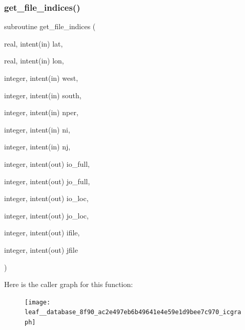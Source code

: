 \subsubsection{\texorpdfstring{get\+\_\+file\+\_\+indices()}{get\_file\_indices()}}
{\footnotesize\ttfamily subroutine get\+\_\+file\+\_\+indices (\begin{DoxyParamCaption}\item[{real, intent(in)}]{lat,  }\item[{real, intent(in)}]{lon,  }\item[{integer, intent(in)}]{west,  }\item[{integer, intent(in)}]{south,  }\item[{integer, intent(in)}]{nper,  }\item[{integer, intent(in)}]{ni,  }\item[{integer, intent(in)}]{nj,  }\item[{integer, intent(out)}]{io\+\_\+full,  }\item[{integer, intent(out)}]{jo\+\_\+full,  }\item[{integer, intent(out)}]{io\+\_\+loc,  }\item[{integer, intent(out)}]{jo\+\_\+loc,  }\item[{integer, intent(out)}]{ifile,  }\item[{integer, intent(out)}]{jfile }\end{DoxyParamCaption})}

Here is the caller graph for this function\+:
\nopagebreak
\begin{figure}[H]
\begin{center}
\leavevmode
\texttt{[image: leaf\_\_database\_8f90\_ac2e497eb6b49641e4e59e1d9bee7c970\_icgraph]}
\end{center}
\end{figure}
\mbox{\label{leaf__database_8f90_a5009d489b8b1c0d281ea517731499fb9}} 
